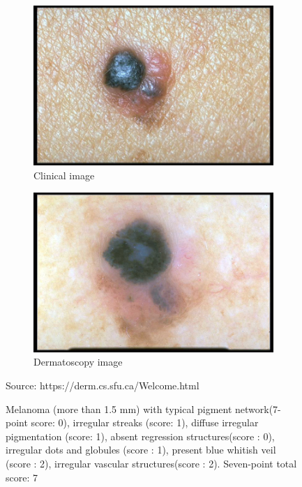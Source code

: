 \begin{figure}
    \centering
    \begin{subfigure}[b]{0.48\linewidth}        %
        \centering
        \includegraphics[width=\linewidth]{images/skin lesion/MEL/Gcl051.jpg}
        \caption{Clinical image\footnotemark[1]}
        
        \label{fig:Mel_A}
    \end{subfigure}
    \begin{subfigure}[b]{0.48\linewidth}        %
        \centering
        \includegraphics[width=\linewidth]{images/skin lesion/MEL/Gcl052.jpg}
        \caption{Dermatoscopy image\footnotemark[2]}
        \label{fig:Mel_B}
    \end{subfigure}
    \caption*{Source: https://derm.cs.sfu.ca/Welcome.html}
    \caption{Melanoma (more than 1.5 mm) with typical pigment network(7-point score: 0), irregular streaks (score: 1), diffuse irregular pigmentation (score: 1), absent regression structures(score : 0), irregular dots and globules (score : 1), present blue whitish veil (score : 2), irregular vascular structures(score : 2). Seven-point total score: 7
    }
 
    \label{fig:MEL_images}
\end{figure}


